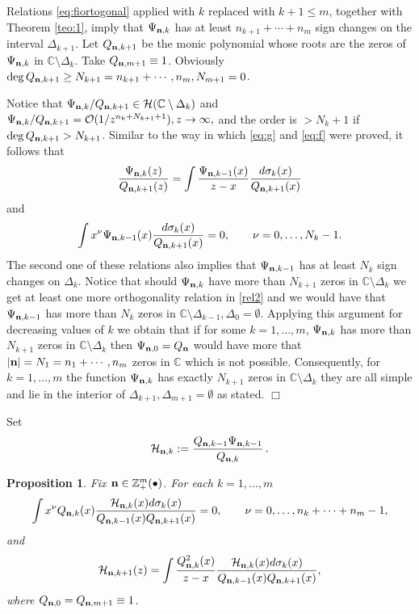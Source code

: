 \documentclass{amsart}
\newtheorem{pro}{\sc Proposition}[section]
\theoremstyle{definition}
\theoremstyle{remark}
\begin{document}
Relations \eqref{eq:fiortogonal} applied with $k$ replaced with $k+1\leq m$, together with Theorem \ref{teo:1}, imply that $\Psi_{{\bf n},k}$ has at least $n_{k+1}+\cdots+n_m$ sign changes on the interval $\Delta_{k+1}$. Let $Q_{{\bf n},k+1}$ be the monic polynomial whose roots are the zeros of $\Psi_{{\bf n},k}$ in $\mathbb{C} \setminus \Delta_k$. Take $Q_{{\bf n},m+1} \equiv 1$. Obviously $\deg Q_{{\bf n},k+1} \geq N_{k+1} = n_{k+1} + \cdots, n_m, N_{m+1} = 0$.

Notice that $\Psi_{{\bf n},k}/Q_{{\bf n},k+1} \in \mathcal{H}(\mathbb{C} \setminus \Delta_{k})$ and $\Psi_{{\bf n},k}/Q_{{\bf n},k+1} = \mathcal{O}(1/z^{n_k+N_{k+1}+1}), z \to \infty,$ and the order is $>N_k+ 1$ if $\deg Q_{{\bf n},k+1} > N_{k+1}$. Similar to the way in which \eqref{eq:g} and \eqref{eq:f} were proved, it follows that
\begin{equation} \label{rel1} \frac{\Psi_{{\bf n},k}(z)}{Q_{{\bf n},k+1}(z)} = \int  \frac{\Psi_{{\bf n},k-1}(x)}{z-x}\frac{d\sigma_k(x)}{Q_{{\bf n},k+1}(x)}
\end{equation}
and
\begin{equation} \label{rel2} \int  x^\nu  {\Psi_{{\bf n},k-1}(x)} \frac{d\sigma_k(x)}{Q_{{\bf n},k+1}(x)} = 0, \qquad \nu = 0,\ldots,N_k -1.
\end{equation}
The second one of these relations also implies that $\Psi_{{\bf n},k-1}$ has at least $N_k$ sign changes on $\Delta_k$. Notice that should $\Psi_{{\bf n},k}$ have more than $N_{k+1}$ zeros in $\mathbb{C} \setminus \Delta_{ k}$ we get at least one more orthogonality relation in \eqref{rel2} and we would have that $\Psi_{{\bf n},k-1}$ has more than $N_k$ zeros in $\mathbb{C} \setminus \Delta_{ k-1}, \Delta_0 = \emptyset$. Applying this argument for decreasing values of $k$ we obtain that if for some $k = 1,\ldots,m$, $\Psi_{{\bf n},k}$ has more than $N_{k+1}$ zeros in  $\mathbb{C} \setminus \Delta_{ k}$ then $\Psi_{{\bf n},0} = Q_{\bf n}$ would have more that $|{\bf n}| = N_1 = n_1 +\cdots,n_m$ zeros in $\mathbb{C}$ which is not possible. Consequently, for $k=1,\ldots,m$ the function $\Psi_{{\bf n},k}$ has exactly $N_{k+1}$ zeros in
$\mathbb{C} \setminus \Delta_{ k}$ they are all simple and lie in the interior of $\Delta_{k+1}, \Delta_{m+1} = \emptyset$ as stated. \hfill $\Box$

\medskip


Set
\[{\mathcal{H}}_{{\bf n},k} :=  \frac{Q_{{\bf n},k-1}\Psi_{{\bf n},k-1}}{Q_{{\bf
n},k}}\,.\]

\begin{pro} \label{pro1}
Fix ${\bf n} \in \mathbb{Z}_+^m(\bullet)$. For each $k=1,\ldots,m$
\begin{equation} \label{rel3}
\int x^{\nu} Q_{{\bf n},k}(x)\frac{\mathcal{H}_{{\bf
n},k}(x)d\sigma_k(x)}{Q_{{\bf n},k-1}(x) Q_{{\bf
n},k+1}(x)}=0, \qquad \nu = 0,\ldots,n_k +\cdots+n_m -1,
\end{equation}
and
\begin{equation} \label{rel4}
\mathcal{H}_{{\bf n},k+1}(z) =  \int \frac{Q_{{\bf n},k}^2(x)}{z-x}\frac{\mathcal{H}_{{\bf
n},k}(x)d\sigma_k(x)}{Q_{{\bf n},k-1}(x) Q_{{\bf
n},k+1}(x)},
\end{equation}
where $Q_{{\bf n},0} = Q_{{\bf n},m+1} \equiv 1$.
\end{pro}
\end{document}
